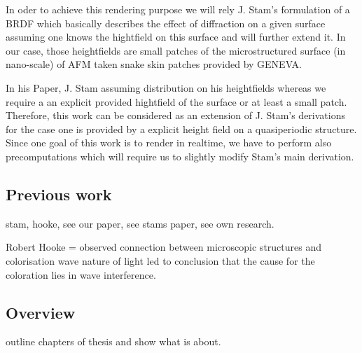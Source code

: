 In oder to achieve this rendering purpose we will rely J. Stam's formulation of a BRDF which basically describes the effect of diffraction on a given surface assuming one knows the hightfield on this surface and will further extend it. 
In our case, those heightfields are small patches of the microstructured surface (in nano-scale) of AFM taken snake skin patches provided by GENEVA.

In his Paper, J. Stam assuming distribution on his heightfields whereas we require a an explicit provided hightfield of the surface or at least a small patch. Therefore, this work can be considered as an extension of J. Stam's derivations for the case one is provided by a explicit height field on a quasiperiodic structure.
Since one goal of this work is to render in realtime, we have to perform also precomputations which will require us to slightly modify Stam's main derivation.


\subsection{Previous work}
stam, hooke, see our paper, see stams paper, see own research.


Robert Hooke = observed connection between microscopic structures and colorisation
wave nature of light led to conclusion that the cause for the coloration lies in wave interference.

\subsection{Overview}
outline chapters of thesis and show what is about.














